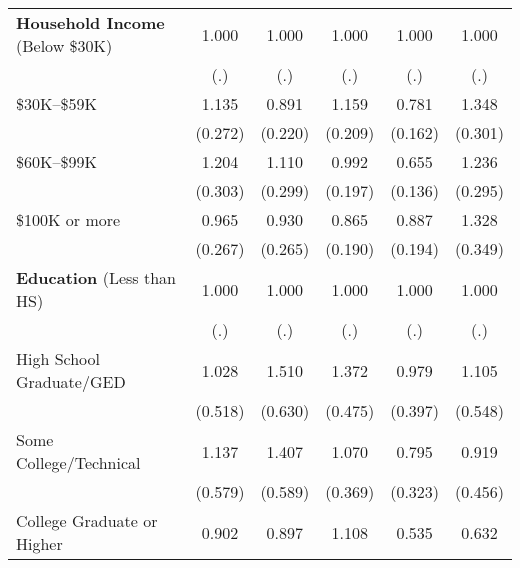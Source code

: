 \begin{table}[htbp]
\begin{tabular}{l*{5}{c}}
\textbf{Household Income} (Below \$30K)&       1.000         &       1.000         &       1.000         &       1.000         &       1.000         \\
                    &         (.)         &         (.)         &         (.)         &         (.)         &         (.)         \\
\$30K--\$59K        &       1.135         &       0.891         &       1.159         &       0.781         &       1.348         \\
                    &     (0.272)         &     (0.220)         &     (0.209)         &     (0.162)         &     (0.301)         \\
\$60K--\$99K        &       1.204         &       1.110         &       0.992         &       0.655\sym{**} &       1.236         \\
                    &     (0.303)         &     (0.299)         &     (0.197)         &     (0.136)         &     (0.295)         \\
\$100K or more      &       0.965         &       0.930         &       0.865         &       0.887         &       1.328         \\
                    &     (0.267)         &     (0.265)         &     (0.190)         &     (0.194)         &     (0.349)         \\
\textbf{Education} (Less than HS)&       1.000         &       1.000         &       1.000         &       1.000         &       1.000         \\
                    &         (.)         &         (.)         &         (.)         &         (.)         &         (.)         \\
High School Graduate/GED&       1.028         &       1.510         &       1.372         &       0.979         &       1.105         \\
                    &     (0.518)         &     (0.630)         &     (0.475)         &     (0.397)         &     (0.548)         \\
Some College/Technical&       1.137         &       1.407         &       1.070         &       0.795         &       0.919         \\
                    &     (0.579)         &     (0.589)         &     (0.369)         &     (0.323)         &     (0.456)         \\
College Graduate or Higher&       0.902         &       0.897         &       1.108         &       0.535         &       0.632         \\

\end{tabular}
\end{table}
